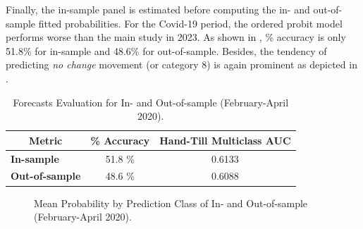 Finally, the in-sample panel is estimated before computing the in- and out-of-sample fitted probabilities. For the Covid-19 period, the ordered probit model performs worse than the main study in 2023. As shown in , \% accuracy is only 51.8\% for in-sample and 48.6\% for out-of-sample. Besides, the tendency of predicting \textit{no change} movement (or category 8) is again prominent as depicted in .


\begin{table}[H]
\centering
\begin{tabular}{@{}lcc@{}}
\toprule
\multicolumn{1}{c}{Metric} & \multicolumn{1}{l}{\textbf{\% Accuracy}} & \multicolumn{1}{l}{\textbf{Hand-Till Multiclass AUC}} \\ \midrule
\textbf{In-sample}         & 51.8 \%                                 & 0.6133                                                \\
\textbf{Out-of-sample}     & 48.6 \%                                 & 0.6088                                                \\ \bottomrule
\end{tabular}
\caption{Forecasts Evaluation for In- and Out-of-sample (February-April 2020).}
\label{tab:table-20}
\end{table}



\begin{figure}[H]
    \centering
    \caption{Mean Probability by Prediction Class of In- and Out-of-sample (February-April 2020).}
    \label{fig:figure-6}
\end{figure}




